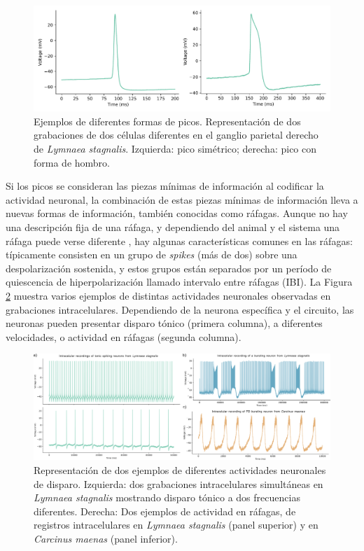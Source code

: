 \begin{figure}[htb!]
	\centering
	\includegraphics[width=\linewidth]{img/intro/spike-types.pdf}
	\caption{Ejemplos de diferentes formas de picos. Representación de dos grabaciones de dos células diferentes en el ganglio parietal derecho de \textit{Lymnaea stagnalis}. Izquierda: pico simétrico; derecha: pico con forma de hombro.}
	\label{fig:spike-types spanish}
\end{figure}

Si los picos se consideran las piezas mínimas de información al codificar la actividad neuronal, la combinación de estas piezas mínimas de información lleva a nuevas formas de información, también conocidas como ráfagas. Aunque no hay una descripción fija de una ráfaga, y dependiendo del animal y el sistema una ráfaga puede verse diferente \parencite{russell_bursting_1978,palmu_detection_2010,lundqvist_gamma_2016}, hay algunas características comunes en las ráfagas: típicamente consisten en un grupo de \textit{spikes} (más de dos) sobre una despolarización sostenida, y estos grupos están separados por un período de quiescencia de hiperpolarización llamado intervalo entre ráfagas (IBI). La Figura \ref{fig:spike_activity-types spanish} muestra varios ejemplos de distintas actividades neuronales observadas en grabaciones intracelulares. Dependiendo de la neurona específica y el circuito, las neuronas pueden presentar disparo tónico (primera columna), a diferentes velocidades, o actividad en ráfagas (segunda columna).

\begin{figure}[htb!]
	\centering
	\includegraphics[width=\linewidth]{img/intro/spike_activity-types.png}
	\caption{Representación de dos ejemplos de diferentes actividades neuronales de disparo. Izquierda: dos grabaciones intracelulares simultáneas en \textit{Lymnaea stagnalis} mostrando disparo tónico a dos frecuencias diferentes. Derecha: Dos ejemplos de actividad en ráfagas, de registros intracelulares en \textit{Lymnaea stagnalis} (panel superior) y en \textit{Carcinus maenas} (panel inferior).}
	\label{fig:spike_activity-types spanish}
\end{figure}

